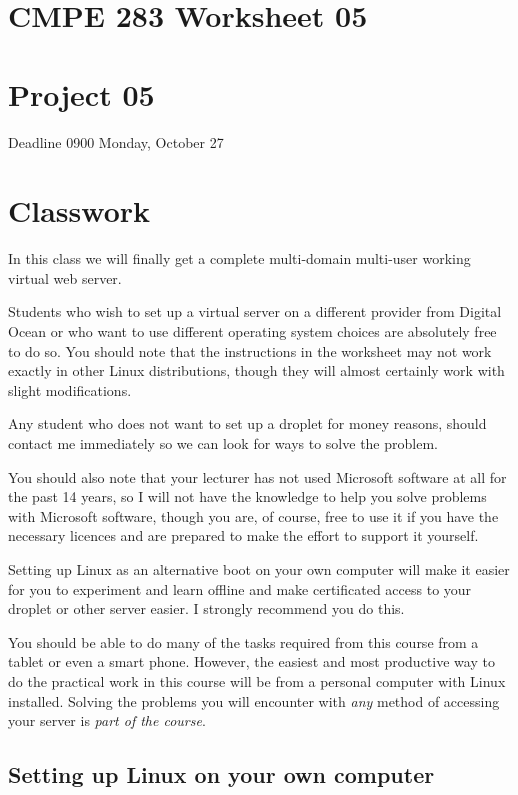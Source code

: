 \documentclass[12pt, a4paper]{article}
\begin{document}

\section*{CMPE 283 Worksheet 05}
\section*{Project 05} 
Deadline 0900 Monday, October 27


\section*{Classwork}
In this class we will finally get a complete multi-domain multi-user working virtual web server.

Students who wish to set up a virtual server on a different provider from 
Digital Ocean or who want to use different operating system choices are 
absolutely free to do so. You should note that the instructions in the worksheet may not work exactly in other Linux distributions, though they will almost certainly work with slight modifications.

Any student who does not want to set up a droplet for money reasons, should contact me immediately so we can look for ways to solve the problem. 

You should also note that your lecturer has not used Microsoft software at all for the past 14 years, so I will not have the knowledge to help you solve problems with Microsoft software, though you are, of course, free to use it if you have the necessary licences and are prepared to make the effort to support it yourself. 

Setting up Linux as an alternative boot on your own computer will make it easier for you to experiment and learn offline and make certificated access to your droplet or other server easier. I strongly recommend you do this.

You should be able to do many of the tasks required from this course from a tablet or even a smart phone. However, the easiest and most productive way to do the practical work in this course will be from a personal computer with Linux installed. Solving the problems you will encounter with \emph{any} method of accessing your server is \emph{part of the course}.

\subsection*{Setting up Linux on your own computer}
\end{document}
